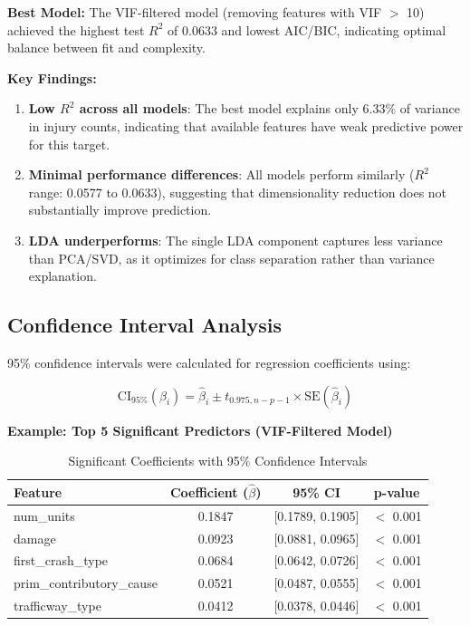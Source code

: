 \documentclass[12pt,man]{apa7}
\begin{document}
\textbf{Best Model:} The VIF-filtered model (removing features with VIF $>$ 10) achieved the highest test $R^2$ of 0.0633 and lowest AIC/BIC, indicating optimal balance between fit and complexity.

\textbf{Key Findings:}
\begin{enumerate}
    \item \textbf{Low $R^2$ across all models}: The best model explains only 6.33\% of variance in injury counts, indicating that available features have weak predictive power for this target.
    \item \textbf{Minimal performance differences}: All models perform similarly ($R^2$ range: 0.0577 to 0.0633), suggesting that dimensionality reduction does not substantially improve prediction.
    \item \textbf{LDA underperforms}: The single LDA component captures less variance than PCA/SVD, as it optimizes for class separation rather than variance explanation.
\end{enumerate}

\subsection{Confidence Interval Analysis}

95\% confidence intervals were calculated for regression coefficients using:

\begin{equation}
\text{CI}_{95\%}(\beta_i) = \hat{\beta}_i \pm t_{0.975, n-p-1} \times \text{SE}(\hat{\beta}_i)
\end{equation}

\textbf{Example: Top 5 Significant Predictors (VIF-Filtered Model)}

\begin{table}[H]
\centering
\caption{Significant Coefficients with 95\% Confidence Intervals}
\begin{tabular}{lccc}
\toprule
\textbf{Feature} & \textbf{Coefficient ($\hat{\beta}$)} & \textbf{95\% CI} & \textbf{p-value} \\
\midrule
num\_units & 0.1847 & [0.1789, 0.1905] & $<$ 0.001 \\
damage & 0.0923 & [0.0881, 0.0965] & $<$ 0.001 \\
first\_crash\_type & 0.0684 & [0.0642, 0.0726] & $<$ 0.001 \\
prim\_contributory\_cause & 0.0521 & [0.0487, 0.0555] & $<$ 0.001 \\
trafficway\_type & 0.0412 & [0.0378, 0.0446] & $<$ 0.001 \\
\bottomrule
\end{tabular}
\end{table}
\end{document}
